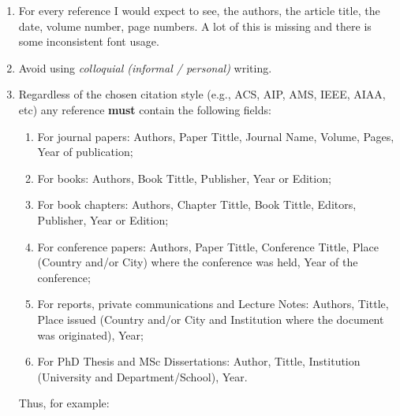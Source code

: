 \documentclass[14pt,twoside]{report}
\begin{document}
\begin{enumerate}
\begin{enumerate}
%
\item For every reference I would expect to see, the authors, the article title, the date, volume number, page numbers. A lot of this is missing and there is some inconsistent font usage.
%
%
\item Avoid using {\it colloquial (informal / personal)} writing.
%
\item Regardless of the chosen citation style (e.g., ACS, AIP, AMS, IEEE, AIAA, etc) any reference {\bf must} contain the following fields: 
\begin{enumerate}
\item For journal papers: Authors, Paper Tittle, Journal Name, Volume, Pages, Year of publication;
\item For books: Authors, Book Tittle, Publisher, Year or Edition;
\item For book chapters: Authors, Chapter Tittle, Book Tittle, Editors, Publisher, Year or Edition;
\item For conference papers: Authors, Paper Tittle, Conference Tittle, Place (Country and/or City) where the conference was held, Year of the conference;
\item For reports,  private communications and Lecture Notes: Authors, Tittle, Place issued (Country and/or City and Institution where the document was originated), Year;
\item For PhD Thesis and MSc Dissertations: Author, Tittle, Institution (University and Department/School), Year.
\end{enumerate}  
Thus, for example:
%
\end{enumerate}


\end{enumerate}
\end{document}
